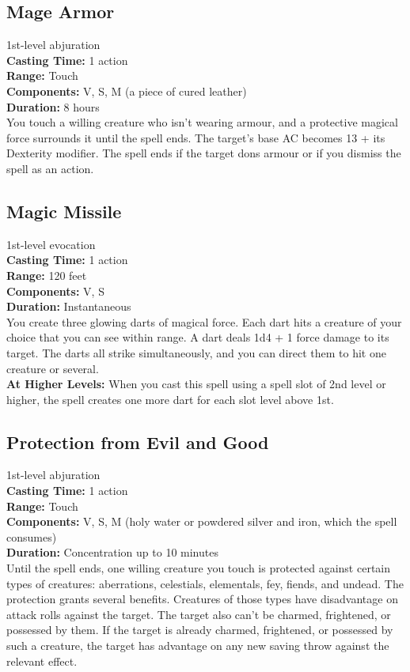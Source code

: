 \documentclass[11pt, A4paper, english]{article}
\begin{document}
		\subsection{Mage Armor}
1st-level abjuration \\
\textbf{Casting Time:} 1 action \\
\textbf{Range:} Touch \\
\textbf{Components:} V, S, M (a piece of cured leather) \\
\textbf{Duration:} 8 hours \\
You touch a willing creature who isn’t wearing armour, and a protective magical force surrounds it until the spell ends. The target’s base AC becomes 13 + its Dexterity modifier. The spell ends if the target dons armour or if you dismiss the spell as an action.

		\subsection{Magic Missile}
1st-level evocation \\
\textbf{Casting Time:} 1 action \\
\textbf{Range:} 120 feet \\
\textbf{Components:} V, S \\
\textbf{Duration:} Instantaneous \\
You create three glowing darts of magical force. Each dart hits a creature of your choice that you can see within range. A dart deals 1d4 + 1 force damage to its target. The darts all strike simultaneously, and you can direct them to hit one creature or several. \\
\textbf{At Higher Levels:} When you cast this spell using a spell slot of 2nd level or higher, the spell creates one more dart for each slot level above 1st.

		\subsection{Protection from Evil and Good}
1st-level abjuration \\
\textbf{Casting Time:} 1 action \\
\textbf{Range:} Touch \\
\textbf{Components:} V, S, M (holy water or powdered silver and iron, which the spell consumes) \\
\textbf{Duration:} Concentration up to  10 minutes \\
Until the spell ends, one willing creature you touch is protected against certain types of creatures: aberrations, celestials, elementals, fey, fiends, and undead. The protection grants several benefits. Creatures of those types have disadvantage on attack rolls against the target. The target also can’t be charmed, frightened, or possessed by them. If the target is already charmed, frightened, or possessed by such a creature, the target has advantage on any new saving throw against the relevant effect.
\end{document}

